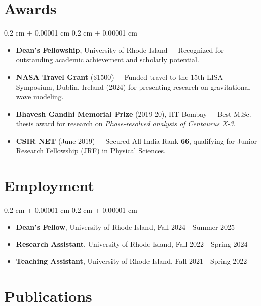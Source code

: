 \documentclass[10pt, letterpaper]{article}
\newenvironment{highlightsforbulletentries}{
    \begin{itemize}[
        topsep=0.10 cm,
        parsep=0.10 cm,
        partopsep=0pt,
        itemsep=0pt,
        leftmargin=10pt
    ]
}{
    \end{itemize}
}
\newenvironment{onecolentry}{
    \begin{adjustwidth}{
        0.2 cm + 0.00001 cm
    }{
        0.2 cm + 0.00001 cm
    }
}{
    \end{adjustwidth}
}
\begin{document}
\section{Awards} 
\begin{onecolentry}
  \begin{highlightsforbulletentries}
    \item \textbf{Dean's Fellowship}, University of Rhode Island -– Recognized for outstanding academic achievement and scholarly potential.

    \item \textbf{NASA Travel Grant} (\$1500) –- Funded travel to the 15th LISA Symposium, Dublin, Ireland (2024) for presenting research on gravitational wave modeling.

    \item \textbf{Bhavesh Gandhi Memorial Prize} (2019-20), IIT Bombay -– Best M.Sc. thesis award for research on \textit{Phase-resolved analysis of Centaurus X-3}.

    \item \textbf{CSIR NET} (June 2019) -– Secured All India Rank \textbf{66}, qualifying for Junior Research Fellowship (JRF) in Physical Sciences.
  \end{highlightsforbulletentries}
\end{onecolentry}


\section{Employment} 
\begin{onecolentry}
  \begin{highlightsforbulletentries}
    \item \textbf{Dean's Fellow}, University of Rhode Island, Fall 2024 - Summer 2025
    \item \textbf{Research Assistant}, University of Rhode Island, Fall 2022 - Spring 2024
    \item \textbf{Teaching Assistant}, University of Rhode Island, Fall 2021 - Spring 2022
  \end{highlightsforbulletentries}
\end{onecolentry}


\section{Publications}
\end{document}
